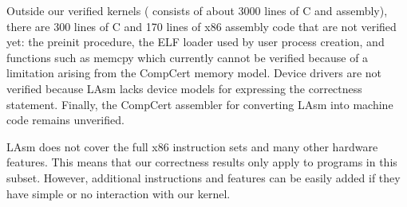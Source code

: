 Outside our verified kernels
(\mCTOShyper{} consists of about 3000 lines of C and assembly), there
are 300 lines of C and 170 lines of x86 assembly code that are not
verified yet: the preinit procedure, the ELF loader used by user
process creation, and functions such as \textsf{memcpy} which currently
cannot be verified because of a limitation arising from the CompCert
memory model. Device drivers are not verified because LAsm
lacks device models for expressing the correctness
statement.  Finally, the CompCert assembler for converting LAsm into
machine code remains unverified. 

LAsm does not cover the full x86 instruction sets and many other
hardware features.  This means that our correctness results only apply
to programs in this subset. However, additional instructions and
features can be easily added if they have simple or no interaction
with our kernel.

